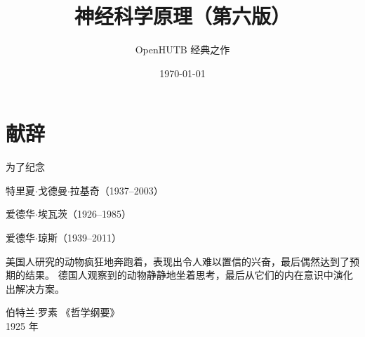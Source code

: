 \documentclass[cn,10pt,citestyle=gb7714-2015, bibstyle=gb7714-2015]{elegantbook}
\title{神经科学原理（第六版）}
\subtitle{OpenHUTB 经典之作}
\institute{\href{https://github.com/OpenHUTB/neuro}{开源湖工商}}
\date{\today}
\numberwithin{figure}{section}
\begin{document}
\maketitle
\frontmatter

\chapter*{献辞}



\begin{center}
为了纪念

特里夏$\cdot$戈德曼$\cdot$拉基奇（1937–2003）

爱德华$\cdot$埃瓦茨（1926–1985）

爱德华$\cdot$琼斯（1939–2011）
\end{center}


\vskip 1.5cm

美国人研究的动物疯狂地奔跑着，表现出令人难以置信的兴奋，最后偶然达到了预期的结果。
德国人观察到的动物静静地坐着思考，最后从它们的内在意识中演化出解决方案。


\vskip 0.5cm


\vskip 1.5cm

\begin{flushright}
伯特兰$\cdot$罗素  《哲学纲要》\\
1925 年
\end{flushright}

\tableofcontents

\mainmatter











































\end{document}
